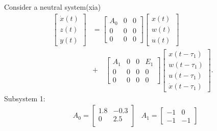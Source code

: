 \documentclass[twocolumn]{autart}    %
\begin{document}
\begin{exmp}
    Consider a neutral system(xia)
    \begin{equation}
        \begin{aligned}
            \begin{bmatrix}
                \dot{x}(t) \\
                z(t) \\
                y(t) 
            \end{bmatrix} & = \begin{bmatrix}
                A_{0} & 0 & 0\\
                0 & 0 & 0\\
                0 & 0 & 0
            \end{bmatrix}\begin{bmatrix}
                x(t) \\
                w(t) \\
                u(t) 
            \end{bmatrix} \\ 
            &+ \quad \begin{bmatrix}
                A_{1} & 0 &0 & E_{1}\\
                0 & 0 & 0 & 0\\
                0 & 0 & 0 & 0
            \end{bmatrix} \begin{bmatrix}
                x(t-\tau_{1}) \\
                w(t-\tau_{1}) \\
                u(t-\tau_{1}) \\
                \dot{x}(t-\tau_{1})
            \end{bmatrix}.\label{eq}
        \end{aligned}
    \end{equation}
    Subsystem 1:
    \begin{equation}
        \begin{aligned}
            &A_{0} =  \begin{bmatrix}
                1.8 & -0.3\\
                0 & 2.5\\
            \end{bmatrix}
            &A_{1} =  \begin{bmatrix}
                -1 & 0\\
                -1 & -1
            \end{bmatrix}\\

\end{aligned}
\end{equation}
\end{exmp}
\end{document}
